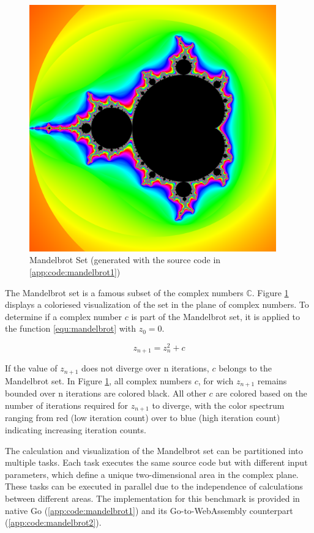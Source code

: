 \begin{figure}[htbp]
  \centering
  \includegraphics[width=0.95\textwidth]{gfx/figures/mandelbrot.png}
  \caption{Mandelbrot Set (generated with the source code in \ref{app:code:mandelbrot1})}
  \label{fig:methodology:mandelbrot}
\end{figure}

The Mandelbrot set is a famous subset of the complex numbers $\mathbb{C}$. Figure \ref{fig:methodology:mandelbrot} displays a coloriesed visualization of the set in the plane of complex numbers. To determine if a complex number $c$ is part of the Mandelbrot set, it is applied to the function \ref{equ:mandelbrot} with $z_{0}=0$.

\begin{equation}
  z_{n+1} = z_{n}^2 + c
  \label{equ:mandelbrot}
\end{equation}

If the value of $z_{n+1}$ does not diverge over n iterations, $c$ belongs to the Mandelbrot set. In Figure \ref{fig:methodology:mandelbrot}, all complex numbers $c$, for wich $z_{n+1}$ remains bounded over n iterations are colored black. All other $c$ are colored based on the number of iterations required for $z_{n+1}$ to diverge, with the color spectrum ranging from red (low iteration count) over to blue (high iteration count) indicating increasing iteration counts.

The calculation and visualization of the Mandelbrot set can be partitioned into multiple tasks. Each task executes the same source code but with different input parameters, which define a unique two-dimensional area in the complex plane. These tasks can be executed in parallel due to the independence of calculations between different areas. The implementation for this benchmark is provided in native Go (\ref{app:code:mandelbrot1}) and its Go-to-WebAssembly counterpart (\ref{app:code:mandelbrot2}).